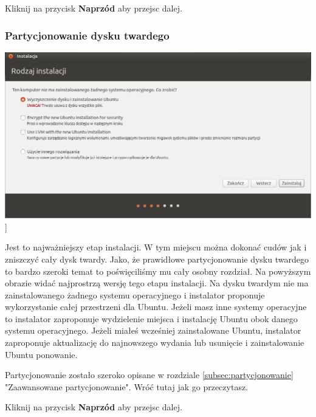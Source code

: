 \begin{flushright}
Kliknij na przycisk \textbf{Naprzód} aby przejsc dalej.
\end{flushright}
\clearpage

\subsubsection{Partycjonowanie dysku twardego}
\begin{center}
	\includegraphics[scale=0.5]{images/instalator_partycjonowanie_proste.png}]
\end{center}

Jest to najważniejszy etap instalacji. W tym miejscu można dokonać cudów jak i zniszczyć cały dysk twardy. Jako, że prawidłowe partycjonowanie dysku twardego to bardzo szeroki temat to poświęciliśmy mu cały osobny rozdział. Na powyższym obrazie widać najprostrzą wersję tego etapu instalacji. Na dysku twardym nie ma zainstalowanego żadnego systemu operacyjnego i instalator proponuje wykorzystanie całej przestrzeni dla Ubuntu. Jeżeli masz inne systemy operacyjne to instalator zaproponuje wydzielenie miejsca i instalację Ubuntu obok danego systemu operacyjnego. Jeżeli miałeś wcześniej zainstalowane Ubuntu, instalator zaproponuje aktualizację do najnowszego wydania lub usunięcie i zainstalowanie Ubuntu ponowanie.

Partycjonowanie zostało szeroko opisane w rozdziale \ref{subsec:partycjonowanie} "Zaawansowane partycjonowanie". Wróć tutaj jak go przeczytasz.

\begin{flushright}
Kliknij na przycisk \textbf{Naprzód} aby przejsc dalej.
\end{flushright}
\clearpage

